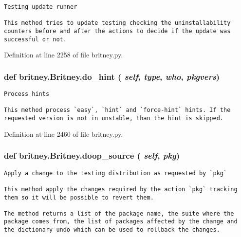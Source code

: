 \footnotesize\begin{verbatim}Testing update runner

This method tries to update testing checking the uninstallability
counters before and after the actions to decide if the update was
successful or not.
\end{verbatim}
\normalsize
 

Definition at line 2258 of file britney.py.
\subsubsection{\setlength{\rightskip}{0pt plus 5cm}def britney.Britney.do\_\-hint ( {\em self},  {\em type},  {\em who},  {\em pkgvers})}\label{classbritney_1_1Britney_7bf70a5ad5754eb949205db3dc4b9c8a}




\footnotesize\begin{verbatim}Process hints

This method process `easy`, `hint` and `force-hint` hints. If the
requested version is not in unstable, than the hint is skipped.
\end{verbatim}
\normalsize
 

Definition at line 2460 of file britney.py.
\subsubsection{\setlength{\rightskip}{0pt plus 5cm}def britney.Britney.doop\_\-source ( {\em self},  {\em pkg})}\label{classbritney_1_1Britney_22af61b8a7f6fe71a79d28b5016cae1d}




\footnotesize\begin{verbatim}Apply a change to the testing distribution as requested by `pkg`

This method apply the changes required by the action `pkg` tracking
them so it will be possible to revert them.

The method returns a list of the package name, the suite where the
package comes from, the list of packages affected by the change and
the dictionary undo which can be used to rollback the changes.
\end{verbatim}
\normalsize
 

